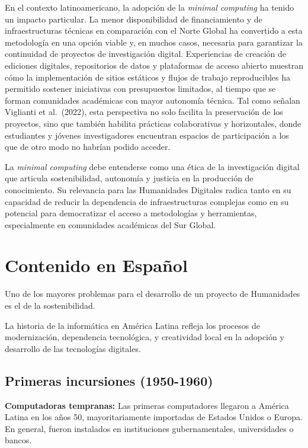 \documentclass[
  letterpaper,
  DIV=11,
  numbers=noendperiod]{scrreprt}
\begin{document}
En el contexto latinoamericano, la adopción de la \emph{minimal
computing} ha tenido un impacto particular. La menor disponibilidad de
financiamiento y de infraestructuras técnicas en comparación con el
Norte Global ha convertido a esta metodología en una opción viable y, en
muchos casos, necesaria para garantizar la continuidad de proyectos de
investigación digital. Experiencias de creación de ediciones digitales,
repositorios de datos y plataformas de acceso abierto muestran cómo la
implementación de sitios estáticos y flujos de trabajo reproducibles ha
permitido sostener iniciativas con presupuestos limitados, al tiempo que
se forman comunidades académicas con mayor autonomía técnica. Tal como
señalan Viglianti et al.~(2022), esta perspectiva no solo facilita la
preservación de los proyectos, sino que también habilita prácticas
colaborativas y horizontales, donde estudiantes y jóvenes investigadores
encuentran espacios de participación a los que de otro modo no habrían
podido acceder.

La \emph{minimal computing} debe entenderse como una ética de la
investigación digital que articula sostenibilidad, autonomía y justicia
en la producción de conocimiento. Su relevancia para las Humanidades
Digitales radica tanto en su capacidad de reducir la dependencia de
infraestructuras complejas como en su potencial para democratizar el
acceso a metodologías y herramientas, especialmente en comunidades
académicas del Sur Global.


\chapter{Contenido en Español}\label{contenido-en-espauxf1ol}

Uno de los mayores problemas para el desarrollo de un proyecto de
Humanidades es el de la sostenibilidad.

La historia de la informática en América Latina refleja los procesos de
modernización, dependencia tecnológica, y creatividad local en la
adopción y desarrollo de las tecnologías digitales.

\section{Primeras incursiones
(1950-1960)}\label{primeras-incursiones-1950-1960}

\textbf{Computadoras tempranas:} Las primeras computadores llegaron a
América Latina en los años 50, mayoritariamente importadas de Estados
Unidos o Europa. En general, fueron instalados en instituciones
gubernamentales, universidades o bancos.
\end{document}
